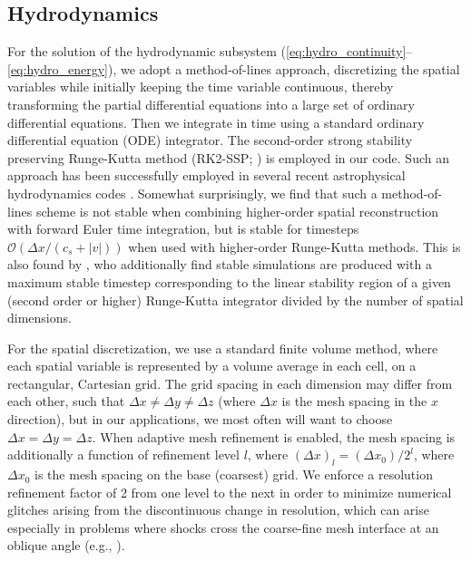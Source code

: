 \documentclass[fleqn,usenatbib]{mnras}
\begin{document}
\subsection{Hydrodynamics}
For the solution of the hydrodynamic subsystem (\autoref{eq:hydro_continuity}--\autoref{eq:hydro_energy}), we adopt a method-of-lines approach, discretizing the spatial variables while initially keeping the time variable continuous, thereby transforming the partial differential equations into a large set of ordinary differential equations. Then we integrate in time using a standard ordinary differential equation (ODE) integrator. The second-order strong stability preserving Runge-Kutta method (RK2-SSP; \citealt{Shu_1988}) is employed in our code. Such an approach has been successfully employed in several recent astrophysical hydrodynamics codes \citep{Skinner_2019,Stone_2020}. Somewhat surprisingly, we find that such a method-of-lines scheme is not stable when combining higher-order spatial reconstruction with forward Euler time integration, but is stable for timesteps $\mathcal{O}(\Delta x / (c_s + |v|))$ when used with higher-order Runge-Kutta methods. This is also found by \cite{Stone_2020}, who additionally find stable simulations are produced with a maximum stable timestep corresponding to the linear stability region of a given (second order or higher) Runge-Kutta integrator divided by the number of spatial dimensions.

For the spatial discretization, we use a standard finite volume method, where each spatial variable is represented by a volume average in each cell, on a rectangular, Cartesian grid. The grid spacing in each dimension may differ from each other, such that $\Delta x \neq \Delta y \neq \Delta z$ (where $\Delta x$ is the mesh spacing in the $x$ direction), but in our applications, we most often will want to choose $\Delta x = \Delta y = \Delta z$. When adaptive mesh refinement is enabled, the mesh spacing is additionally a function of refinement level $l$, where $(\Delta x)_{l} = (\Delta x_0) / 2^{l}$, where $\Delta x_0$ is the mesh spacing on the base (coarsest) grid. We enforce a resolution refinement factor of 2 from one level to the next in order to minimize numerical glitches arising from the discontinuous change in resolution, which can arise especially in problems where shocks cross the coarse-fine mesh interface at an oblique angle (e.g., \citealt{Fryxell_2000}).
\end{document}
